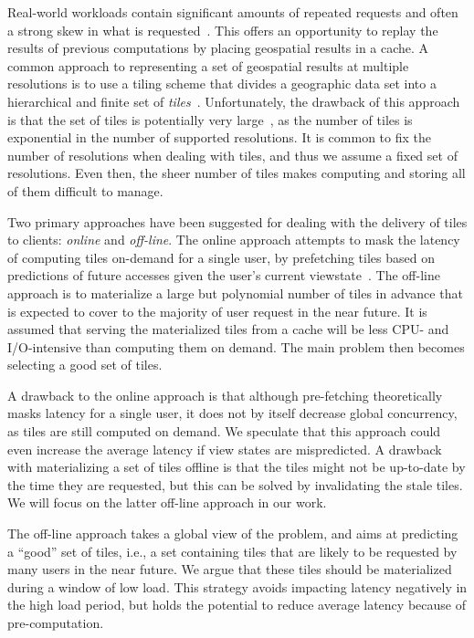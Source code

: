 \documentclass[11pt, oneside]{report}
\begin{document}
{%
Real-world workloads contain significant amounts of repeated requests and often a strong skew in what is requested~\cite{fisher07hotmap,talagala2000webimage}. This offers an opportunity to replay the results of previous computations by placing geospatial results in a cache. A common approach to representing a set of geospatial results at multiple resolutions is to use a tiling scheme that divides a geographic data set into a hierarchical and finite set of \emph{tiles}~\cite{decola1993pyramid}. Unfortunately, the drawback of this approach is that the set of tiles is potentially very large~\cite{garcia2011adaptive}, as the number of tiles is exponential in the number of supported resolutions. It is common to fix the number of resolutions when dealing with tiles, and thus we assume a fixed set of resolutions. Even then, the sheer number of tiles makes computing and storing all of them difficult to manage.

Two primary approaches have been suggested for dealing with the delivery of tiles to clients: \emph{online} and \emph{off-line}. The online approach attempts to mask the latency of computing tiles on-demand for a single user, by prefetching tiles based on predictions of future accesses given the user's current viewstate~\cite{kang2001prefetching,kim2001prefetching,lee2001prefetching}. The off-line approach is to materialize a large but polynomial number of tiles in advance that is expected to cover to the majority of user request in the near future. It is assumed that serving the materialized tiles from a cache will be less CPU- and I/O-intensive than computing them on demand. The main problem then becomes selecting a good set of tiles. 

A drawback to the online approach is that although pre-fetching theoretically masks latency for a single user, it does not by itself decrease global concurrency, as tiles are still computed on demand. We speculate that this approach could even increase the average latency if view states are mispredicted. A drawback with materializing a set of tiles offline is that the tiles might not be up-to-date by the time they are requested, but this can be solved by invalidating the stale tiles. We will focus on the latter off-line approach in our work.

The off-line approach takes a global view of the problem, and aims at predicting a ``good'' set of tiles, i.e., a set containing tiles that are likely to be requested by many users in the near future. We argue that these tiles should be materialized during a window of low load. This strategy avoids impacting latency negatively in the high load period, but holds the potential to reduce average latency because of pre-computation.

}
\end{document}
